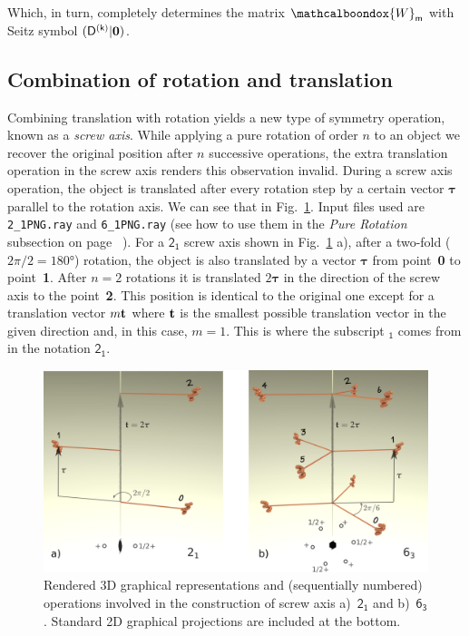 \vspace{0.2cm}
Which, in turn, completely determines the matrix $\mathcalboondox{W}_\mathsf{m}$ with Seitz symbol  $(\mathsf{D^{(k)}} |\vb{0})$.



\subsection{Combination of rotation and translation}
\label{sec:screw}
Combining translation with rotation yields a new type of symmetry operation, known as a \textit{screw axis}. While applying a pure rotation of order $n$ to an object we recover the original position after $n$ successive operations, the extra translation operation in the screw axis renders this observation invalid. During a screw axis operation, the object is translated after every rotation step by a certain vector $\boldsymbol{\tau}$ parallel to the rotation axis. We can see that in Fig.~\ref{Fig:ScrewRotation}. Input files used are \texttt{2\_1PNG.ray} and \texttt{6\_1PNG.ray}  (see how to use them in the \textit{Pure Rotation} subsection on page~\pageref{Fig:pureRotation} ).  For a $\mathsf{2_1}$ screw axis shown in Fig.~\ref{Fig:ScrewRotation} a), after a two-fold ($2\pi/2=180\si{\degree}$) rotation, the object is also translated by a vector $\boldsymbol{\tau}$ from point~\textbf{0} to point~\textbf{1}. After $n=2$ rotations it is translated $2 \boldsymbol{\tau}$ in the direction of the screw axis to the point~\textbf{2}. This position is identical to the original one except for a translation vector $m \vb{t}$ where $\vb{t}$ is the smallest possible translation vector in the given direction and, in this case, $m=1$. This is where the subscript $_\mathsf{1}$ comes from in the notation $\mathsf{2_1}$.


\begin{figure}[ht]
    \centering
\includegraphics[width=1.\linewidth]{Figures/screwRotation.png}
\caption[Operations steps for screw axis.]{Rendered 3D graphical representations and (sequentially numbered) operations involved in the construction of screw axis a)~$\mathsf{2_1}$ and b)~$\mathsf{6_3}$. Standard 2D graphical projections are included at the bottom. }
\label{Fig:ScrewRotation}
\end{figure}

